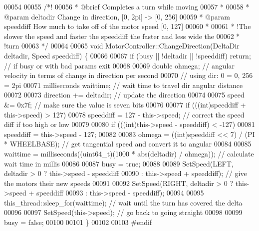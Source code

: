 \begin{DoxyCode}
00054 
00055 \textcolor{comment}{/*!}
00056 \textcolor{comment}{  *  @brief Completes a turn while moving }
00057 \textcolor{comment}{  * }
00058 \textcolor{comment}{  *  @param deltadir Change in direction, [0, 2pi] -> [0, 256]}
00059 \textcolor{comment}{  *  @param speeddiff How much to take off of the motor speed [0, 127]}
00060 \textcolor{comment}{  * }
00061 \textcolor{comment}{  *  !The slower the speed and faster the speeddiff the faster and less wide the}
00062 \textcolor{comment}{  *  !turn}
00063 \textcolor{comment}{  */}
00064 
00065 \textcolor{keywordtype}{void} MotorController::ChangeDirection(DeltaDir deltadir, Speed speeddiff) \{
00066 
00067   \textcolor{keywordflow}{if} (busy || !deltadir || !speeddiff) \textcolor{keywordflow}{return}; \textcolor{comment}{// if busy or with bad params exit}
00068 
00069   \textcolor{keywordtype}{double} ohmega; \textcolor{comment}{// angular velocity in terms of change in direction per second}
00070                  \textcolor{comment}{// using dir: 0 = 0, 256 = 2pi}
00071   milliseconds waittime; \textcolor{comment}{// wait time to travel dir angular distance}
00072 
00073   direction += deltadir; \textcolor{comment}{// update the direction }
00074 
00075   speed &= 0x7f; \textcolor{comment}{// make sure the value is seven bits}
00076 
00077   \textcolor{keywordflow}{if} (((\textcolor{keywordtype}{int})speeddiff + \textcolor{keyword}{this}->speed) > 127)
00078     speeddiff = 127 - \textcolor{keyword}{this}->speed; \textcolor{comment}{// correct the speed diff if too high or low}
00079 
00080   \textcolor{keywordflow}{if} (((\textcolor{keywordtype}{int})\textcolor{keyword}{this}->speed - speeddiff) < -127)
00081     speeddiff = \textcolor{keyword}{this}->speed - 127;
00082 
00083   ohmega = ((\textcolor{keywordtype}{int})speeddiff << 7) / (PI * WHEELBASE); \textcolor{comment}{// get tangential speed and convert it to angular}
00084 
00085   waittime = milliseconds((uint64\_t)(1000 * abs(deltadir) / ohmega)); \textcolor{comment}{// calculate wait time in millis}
00086 
00087   busy = \textcolor{keyword}{true};
00088 
00089   SetSpeed(LEFT, deltadir > 0 ? \textcolor{keyword}{this}->speed - speeddiff
00090                               : \textcolor{keyword}{this}->speed + speeddiff); \textcolor{comment}{// give the motors their new speeds}
00091 
00092   SetSpeed(RIGHT, deltadir > 0 ? \textcolor{keyword}{this}->speed + speeddiff
00093                                : \textcolor{keyword}{this}->speed - speeddiff);
00094 
00095   this\_thread::sleep\_for(waittime); \textcolor{comment}{// wait until the turn has covered the delta}
00096 
00097   SetSpeed(\textcolor{keyword}{this}->speed); \textcolor{comment}{// go back to going straight}
00098 
00099   busy = \textcolor{keyword}{false};
00100 
00101 \}
00102 
00103 \textcolor{preprocessor}{#}\textcolor{preprocessor}{endif}
\end{DoxyCode}
